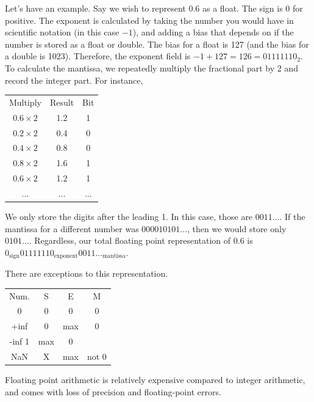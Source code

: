 Let's have an example. Say we wish to represent $0.6$ as a float. The
sign is 0 for positive. The exponent is calculated by taking the number
you would have in scientific notation (in this case $-1$), and adding
a bias that depends on if the number is stored as a float or double.
The bias for a float is 127 (and the bias for a double is 1023). Therefore,
the exponent field is $-1 + 127 = 126 = 01111110_{2}$.
To calculate the mantissa, we repeatedly multiply the fractional part
by 2 and record the integer part. For instance,

\begin{tabular}{| c | c | c |}
    Multiply       & Result & Bit \\
    $0.6 \times 2$ & 1.2    & 1   \\
    $0.2 \times 2$ & 0.4    & 0   \\
    $0.4 \times 2$ & 0.8    & 0   \\
    $0.8 \times 2$ & 1.6    & 1   \\
    $0.6 \times 2$ & 1.2    & 1   \\
    ...            & ...    & ...
\end{tabular}

We only store the digits after the leading 1. In this case, those are
$0011...$. If the mantissa for a different number was $000010101...$,
then we would store only $0101...$. Regardless, our total floating
point representation of 0.6 is $0_{\text{sign}}01111110_{\text{exponent}}0011..._{\text{mantissa}}$.

There are exceptions to this representation.
\begin{tabular}{| c | c | c | c |}
    Num.   & S   & E   & M     \\
    0      & 0   & 0   & 0     \\
    +inf   & 0   & max & 0     \\
    -inf 1 & max & 0           \\
    NaN    & X   & max & not 0
\end{tabular}

Floating point arithmetic is relatively expensive compared to integer arithmetic,
and comes with loss of precision and floating-point errors.
